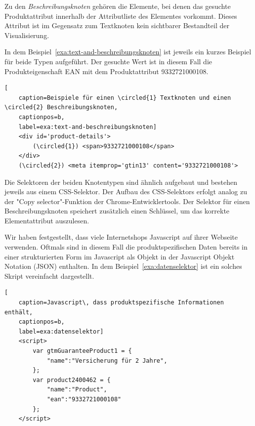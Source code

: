 Zu den \textit{Beschreibungsknoten} gehören die Elemente, bei denen das gesuchte Produktattribut innerhalb der
Attributliste des Elementes vorkommt.
Dieses Attribut ist im Gegensatz zum Textknoten kein sichtbarer Bestandteil der Visualisierung.

In dem Beispiel~\ref{exa:text-and-beschreibungsknoten} ist jeweils ein kurzes Beispiel für beide Typen aufgeführt.
Der gesuchte Wert ist in diesem Fall die Produkteigenschaft EAN mit dem Produktattribut 9332721000108.

\begin{lstlisting}[
    caption=Beispiele für einen \circled{1} Textknoten und einen \circled{2} Beschreibungsknoten,
    captionpos=b,
    label=exa:text-and-beschreibungsknoten]
    <div id='product-details'>
        (\circled{1}) <span>9332721000108</span>
    </div>
    (\circled{2}) <meta itemprop='gtin13' content='9332721000108'>
\end{lstlisting}

Die Selektoren der beiden Knotentypen sind ähnlich aufgebaut und bestehen jeweils aus einem CSS-Selektor.
Der Aufbau des CSS-Selektors erfolgt analog zu der "Copy selector"-Funktion der Chrome-Entwicklertools.
Der Selektor für einen Beschreibungsknoten speichert zusätzlich einen Schlüssel, um das korrekte Elementattribut
auszulesen.

Wir haben festgestellt, dass viele Internetshops Javascript auf ihrer Webseite verwenden.
Oftmals sind in diesem Fall die produktspezifischen Daten bereits in einer strukturierten Form im Javascript
als Objekt in der Javascript Objekt Notation (JSON) enthalten.
In dem Beispiel~\ref{exa:datenselektor} ist ein solches Skript vereinfacht dargestellt.

\begin{lstlisting}[
    caption=Javascript\, dass produktspezifische Informationen enthält,
    captionpos=b,
    label=exa:datenselektor]
    <script>
        var gtmGuaranteeProduct1 = {
            "name":"Versicherung für 2 Jahre",
        };
        var product2400462 = {
            "name":"Product",
            "ean":"9332721000108"
        };
    </script>
\end{lstlisting}

